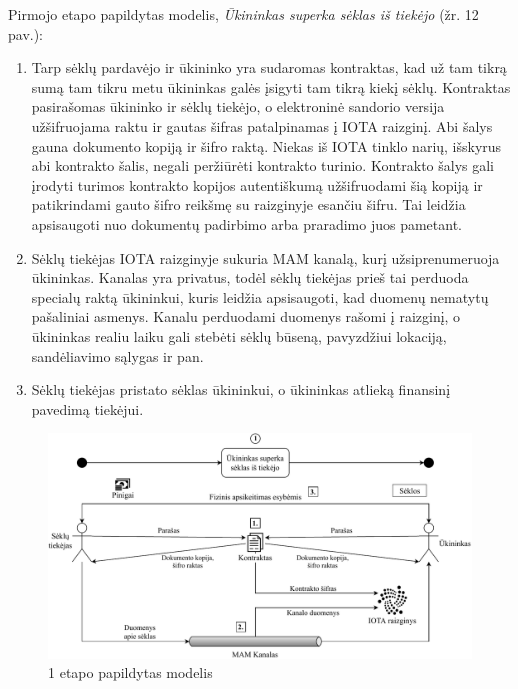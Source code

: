 Pirmojo etapo papildytas modelis, \textit{Ūkininkas superka sėklas iš tiekėjo} (žr. 12 pav.):
\begin{enumerate}
    \item Tarp sėklų pardavėjo ir ūkininko yra sudaromas kontraktas, kad už tam tikrą sumą tam tikru metu ūkininkas galės įsigyti tam tikrą kiekį sėklų. Kontraktas pasirašomas ūkininko ir sėklų tiekėjo, o elektroninė sandorio versija užšifruojama raktu ir gautas šifras patalpinamas į IOTA raizginį. Abi šalys gauna dokumento kopiją ir šifro raktą. Niekas iš IOTA tinklo narių, išskyrus abi kontrakto šalis, negali peržiūrėti kontrakto turinio. Kontrakto šalys gali įrodyti turimos kontrakto kopijos autentiškumą užšifruodami šią kopiją ir patikrindami gauto šifro reikšmę su raizginyje esančiu šifru. Tai leidžia apsisaugoti nuo dokumentų padirbimo arba praradimo juos pametant. 
    \item Sėklų tiekėjas IOTA raizginyje sukuria MAM kanalą, kurį užsiprenumeruoja ūkininkas. Kanalas yra privatus, todėl sėklų tiekėjas prieš tai perduoda specialų raktą ūkininkui, kuris leidžia apsisaugoti, kad duomenų nematytų pašaliniai asmenys. Kanalu perduodami duomenys rašomi į raizginį, o ūkininkas realiu laiku gali stebėti sėklų būseną, pavyzdžiui lokaciją, sandėliavimo sąlygas ir pan.
    \item Sėklų tiekėjas pristato sėklas ūkininkui, o ūkininkas atlieką finansinį pavedimą tiekėjui.
\end{enumerate}

\begin{figure}[H]
    \centering
    \includegraphics[scale=0.7]{images/iota-usecase-1}
    \caption{1 etapo papildytas modelis}
\end{figure}




